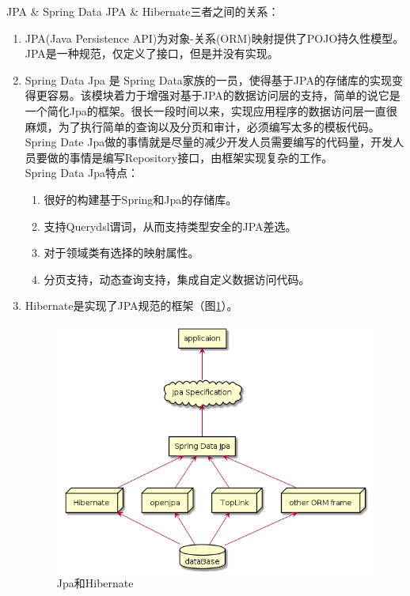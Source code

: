 JPA \& Spring Data JPA \& Hibernate三者之间的关系：
\begin{enumerate}
  \item JPA(Java Persistence API)为对象-关系(ORM)映射提供了POJO持久性模型。JPA是一种规范，仅定义了接口，但是并没有实现。
  \item Spring Data Jpa 是 Spring Data家族的一员，使得基于JPA的存储库的实现变得更容易。该模块着力于增强对基于JPA的数据访问层的支持，简单的说它是一个简化Jpa的框架。很长一段时间以来，实现应用程序的数据访问层一直很麻烦，为了执行简单的查询以及分页和审计，必须编写太多的模板代码。Spring Date Jpa做的事情就是尽量的减少开发人员需要编写的代码量，开发人员要做的事情是编写Repository接口，由框架实现复杂的工作。\\
        Spring Data Jpa特点：
        \begin{enumerate}
          \item 很好的构建基于Spring和Jpa的存储库。
          \item 支持Querydsl谓词，从而支持类型安全的JPA差选。
          \item 对于领域类有选择的映射属性。
          \item 分页支持，动态查询支持，集成自定义数据访问代码。
        \end{enumerate}
  \item Hibernate是实现了JPA规范的框架（图\ref{JpaAndHibernate}）。
        \begin{figure}[htbp]
          \centering
          \includegraphics[scale = 0.6]{out/uml/部署图/Jpa和Hibernate/Jpa和Hibernate.png}
          \caption{\song\wuhao Jpa和Hibernate}
          \label{JpaAndHibernate}

\end{figure}
\end{enumerate}
